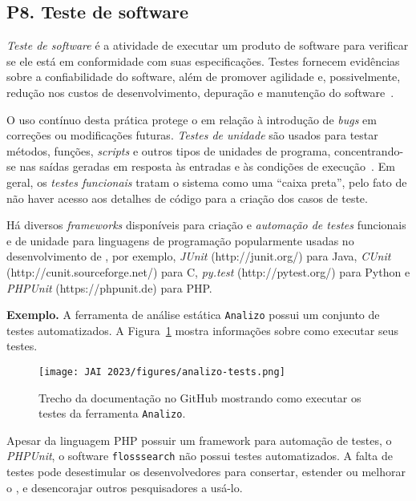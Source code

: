 \subsection*{P8. Teste de software} 

\textit{Teste de software} é a atividade de executar um produto de software para verificar se ele está em conformidade com suas especificações.
Testes fornecem evidências sobre a confiabilidade do software, além de promover agilidade e, possivelmente, redução nos custos de desenvolvimento, depuração e manutenção do software~\cite{maldonado:book}.  

O uso contínuo desta prática protege o \RSw em relação à introdução de \textit{bugs} em correções ou modificações futuras.
\textit{Testes de unidade} são usados para testar métodos, funções, \textit{scripts} e outros tipos de unidades de programa, concentrando-se nas saídas geradas em resposta às entradas e às condições de execução~\cite{maldonado:book}. Em geral, os \textit{testes funcionais} tratam o sistema como uma ``caixa preta'', pelo fato de não haver acesso aos detalhes de código para a criação dos casos de teste.

Há diversos \textit{frameworks} disponíveis para criação e \textit{automação de testes} funcionais e de unidade para linguagens de programação popularmente usadas no desenvolvimento de \RS, por exemplo, \textit{JUnit} (http://junit.org/) para Java, \textit{CUnit} (http://cunit.sourceforge.net/) para C, 
\textit{py.test} (http://pytest.org/) para Python e \textit{PHPUnit} (https://phpunit.de) para PHP.

\noindent\textbf{Exemplo.} A ferramenta de análise estática \texttt{Analizo} possui um conjunto de testes automatizados. 
%
A Figura~\ref{fig:testes:analizo} mostra informações sobre como executar seus testes.

\begin{figure}[tb]
    \centering
    \texttt{[image: JAI 2023/figures/analizo-tests.png]}
    \caption{Trecho da documentação no GitHub mostrando como executar os testes da ferramenta \texttt{Analizo}.}
    \label{fig:testes:analizo}
\end{figure}

Apesar da linguagem PHP possuir um framework para automação de testes, o \textit{PHPUnit}, o software \texttt{flosssearch} não possui testes automatizados. 
A falta de testes pode desestimular os desenvolvedores para consertar, estender ou melhorar o \RS, e desencorajar outros pesquisadores a usá-lo. 

